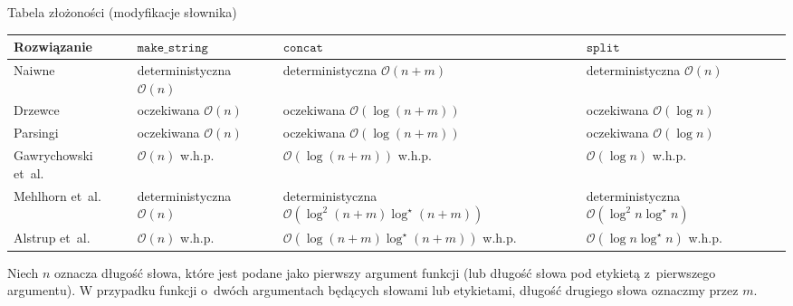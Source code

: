 \documentclass[polish]{beamer}
\begin{document}
\begin{frame}{Tabela złożoności (modyfikacje słownika)}
    \begin{lrbox}{\firstbox}
        \begin{tabular}{ | m{2.3cm} | >{\centering\arraybackslash}m{2.8cm} | >{\centering\arraybackslash}m{4.5cm} | >{\centering\arraybackslash}m{2.8cm} | }
            \hline
            Rozwiązanie & $\texttt{make\_string}$ & $\texttt{concat}$ & $\texttt{split}$ \\
            \hline
            Naiwne & deterministyczna $\mathcal{O}(n)$ & deterministyczna $\mathcal{O}(n + m)$ & deterministyczna $\mathcal{O}(n)$ \\ 
            \hline
            Drzewce & oczekiwana $\mathcal{O}(n)$ & oczekiwana $\mathcal{O}(\log(n + m))$ & oczekiwana $\mathcal{O}(\log n)$ \\
            \hline
            Parsingi & oczekiwana $\mathcal{O}(n)$ & oczekiwana $\mathcal{O}(\log(n + m))$ & oczekiwana $\mathcal{O}(\log n)$ \\
            \hline
            Gawrychowski et~al. & $\mathcal{O}(n)$ w.h.p. & $\mathcal{O}(\log(n + m))$ w.h.p. & $\mathcal{O}(\log n)$ w.h.p. \\
            \hline
            Mehlhorn et~al. & deterministyczna $\mathcal{O}(n)$ & deterministyczna $\mathcal{O}(\log^2(n + m)\log^\star(n + m))$ & deterministyczna $\mathcal{O}(\log^2 n \log^\star n)$ \\
            \hline 
            Alstrup et~al. & $\mathcal{O}(n)$ w.h.p. & $\mathcal{O}(\log(n + m)\log^\star(n + m))$ w.h.p. & $\mathcal{O}(\log n \log^\star n)$ w.h.p.\\
            \hline
        \end{tabular}
    \end{lrbox}
    \begin{block}{}
        Niech $n$ oznacza długość słowa, które jest podane jako pierwszy argument funkcji (lub długość słowa pod etykietą z~pierwszego argumentu). W przypadku funkcji o~dwóch argumentach będących słowami lub etykietami, długość drugiego słowa oznaczmy przez $m$.
    \end{block}
    \pause
    \begin{center}
        \scalebox{0.8}{\usebox{\firstbox}}
    \end{center}
\end{frame}

\newsavebox{\secondbox}
\end{document}
